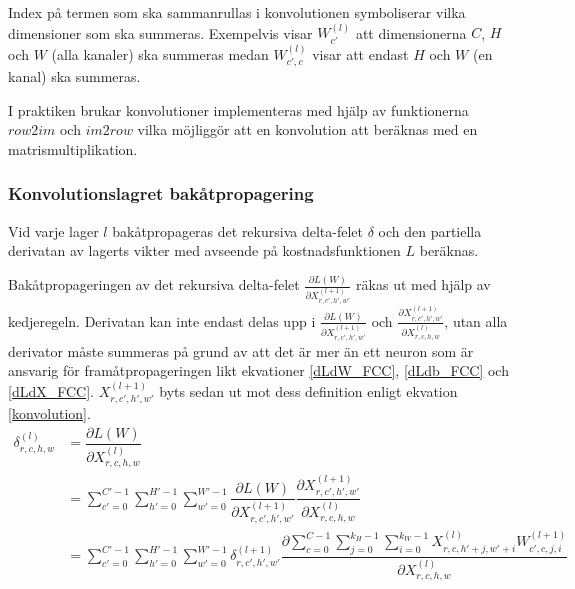 \documentclass[a4paper,11pt,twoside]{article}
\newcommand*{\pd}[2]{\ensuremath{\dfrac{\partial #1}{\partial #2}}}
\newcommand*{\inpd}[2]{\ensuremath{\frac{\partial #1}{\partial #2}}}
\begin{document}
Index på termen som ska sammanrullas i konvolutionen symboliserar vilka dimensioner som ska summeras. Exempelvis visar $W^{(l)}_{c'}$ att dimensionerna $C$, $H$ och $W$ (alla kanaler) ska summeras medan  $W^{(l)}_{c', c}$ visar att endast $H$ och $W$ (en kanal) ska summeras.

I praktiken brukar konvolutioner implementeras med hjälp av funktionerna $row2im$ och $im2row$ vilka möjliggör att en konvolution att beräknas med en matrismultiplikation. \cite{cs231n} \cite{convmath} \cite{convarithmetic}

\subsubsection{Konvolutionslagret bakåtpropagering}
Vid varje lager $l$ bakåtpropageras det rekursiva delta-felet $\delta$ och den partiella derivatan av lagerts vikter med avseende på kostnadsfunktionen $L$ beräknas. 

Bakåtpropageringen av det rekursiva delta-felet $\inpd{L(W)}{X^{(l+1)}_{r,c',h',w'}}$ räkas ut med hjälp av kedjeregeln. Derivatan kan inte endast delas upp i $\inpd{L(W)}{X^{(l+1)}_{r,c',h',w'}}$ och $\inpd{X^{(l+1)}_{r,c',h',w'}}{X^{(l)}_{r,c,h,w}}$, utan alla derivator måste summeras på grund av att det är mer än ett neuron som är ansvarig för framåtpropageringen likt ekvationer \eqref{dLdW_FCC}, \eqref{dLdb_FCC} och \eqref{dLdX_FCC}. $X^{(l+1)}_{r,c',h',w'}$ byts sedan ut mot dess definition enligt ekvation \eqref{konvolution}. \cite{convmath} \cite{webconv1} \cite{webconv2} \cite{webconv3}
\begin{equation}\label{konvolutionbackprop}
\begin{split}
	\delta^{(l)}_{r,c,h,w}
		& = \pd{L(W)}{X^{(l)}_{r,c,h,w}} \\
		& = \sum^{C'-1}_{c'=0} \sum^{H'-1}_{h'=0} \sum^{W'-1}_{w'=0} \pd{L(W)}{X^{(l+1)}_{r,c',h',w'}} \pd{X^{(l+1)}_{r,c',h',w'}}{X^{(l)}_{r,c,h,w}} \\
		& = \sum^{C'-1}_{c'=0} \sum^{H'-1}_{h'=0} \sum^{W'-1}_{w'=0} \delta^{(l+1)}_{r,c',h',w'} \pd{\sum^{C-1}_{c=0} \sum^{k_H-1}_{j=0} \sum^{k_W-1}_{i=0} X^{(l)}_{r, c, h'+j, w'+i}W^{(l+1)}_{c', c, j, i}}{X^{(l)}_{r,c,h,w}}
\end{split}
\end{equation}
\end{document}
